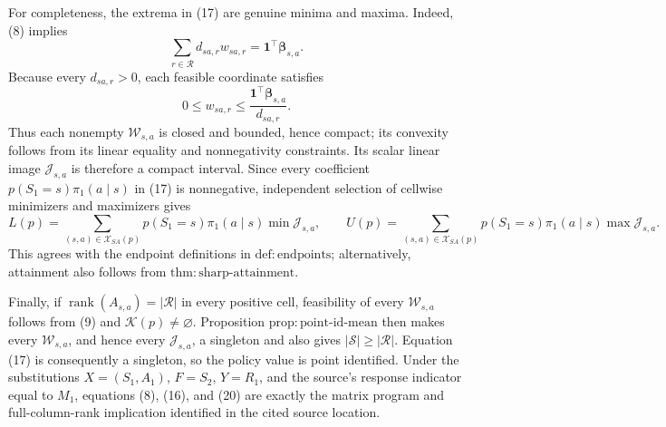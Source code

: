 For completeness, the extrema in (17) are genuine minima and maxima. Indeed, (8) implies
\[
\sum_{r\in\mathcal R}d_{sa,r}w_{sa,r}
=\mathbf 1^\top\boldsymbol\beta_{s,a}.
\tag{18}
\]
Because every \(d_{sa,r}>0\), each feasible coordinate satisfies
\[
0\le w_{sa,r}\le
\frac{\mathbf 1^\top\boldsymbol\beta_{s,a}}{d_{sa,r}}.
\tag{19}
\]
Thus each nonempty \(\mathcal W_{s,a}\) is closed and bounded, hence compact; its convexity follows from its linear equality and nonnegativity constraints. Its scalar linear image \(\mathcal J_{s,a}\) is therefore a compact interval. Since every coefficient \(p(S_1=s)\pi_1(a\mid s)\) in (17) is nonnegative, independent selection of cellwise minimizers and maximizers gives
\[
L(p)=\sum_{(s,a)\in\mathcal X_{SA}(p)}
p(S_1=s)\pi_1(a\mid s)\min\mathcal J_{s,a},
\qquad
U(p)=\sum_{(s,a)\in\mathcal X_{SA}(p)}
p(S_1=s)\pi_1(a\mid s)\max\mathcal J_{s,a}.
\tag{20}
\]
This agrees with the endpoint definitions in \(\mathrm{def{:}endpoints}\); alternatively, attainment also follows from \(\mathrm{thm{:}sharp\text{-}attainment}\).

Finally, if \(\operatorname{rank}(A_{s,a})=|\mathcal R|\) in every positive cell, feasibility of every \(\mathcal W_{s,a}\) follows from (9) and \(\mathcal K(p)\ne\varnothing\). Proposition \(\mathrm{prop{:}point\text{-}id\text{-}mean}\) then makes every \(\mathcal W_{s,a}\), and hence every \(\mathcal J_{s,a}\), a singleton and also gives \(|\mathcal S|\ge|\mathcal R|\). Equation (17) is consequently a singleton, so the policy value is point identified. Under the substitutions \(X=(S_1,A_1)\), \(F=S_2\), \(Y=R_1\), and the source's response indicator equal to \(M_1\), equations (8), (16), and (20) are exactly the matrix program and full-column-rank implication identified in the cited source location.

